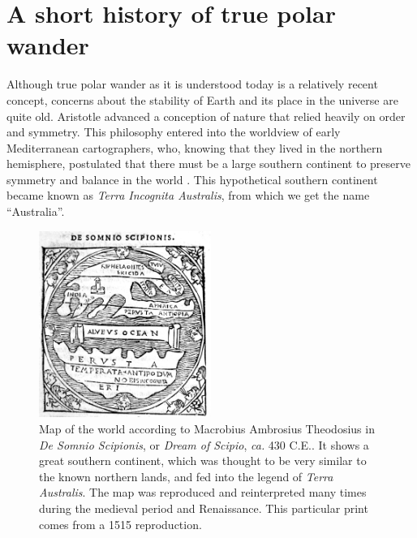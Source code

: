 \section{A short history of true polar wander}

Although true polar wander as it is understood today is a relatively recent concept,
concerns about the stability of Earth and its place in the universe are quite old.
Aristotle advanced a conception of nature that relied heavily on order and symmetry.
This philosophy entered into the worldview of early Mediterranean cartographers, who, knowing that
they lived in the northern hemisphere, postulated that there must be a large
southern continent to preserve symmetry and balance in the world \citep{wilford2001mapmakers}.
This hypothetical southern continent became known as \emph{Terra Incognita Australis}, from which
we get the name ``Australia''.

\begin{figure}
\centering
\includegraphics[width=0.5\textwidth]{intro/figures/macrobius.jpg}
\caption[Map of the world according to Macrobius.]{Map of the world according to Macrobius Ambrosius Theodosius in \emph{De Somnio Scipionis}, or \emph{Dream of Scipio}, \emph{ca.} 430 C.E..
It shows a great southern continent, which was thought to be very similar to the known northern lands, and fed into the legend of \emph{Terra Australis}.
The map was reproduced and reinterpreted many times during the medieval period and Renaissance. This particular print comes from a 1515 reproduction.}
\label{fig:macrobius}
\end{figure}

